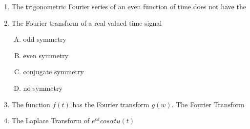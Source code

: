 \documentclass[journal,12pt,twocolumn]{IEEEtran}
\begin{document}
\begin{enumerate}
\setlength\itemsep{2em}
\item The trigonometric Fourier series of an even function of time does not have the\\

\begin{enumerate}[(A)]
\end{enumerate}

\item The Fourier transform of a real valued time signal\\

\begin{enumerate}[(A)]
\setlength\itemsep{2em}

\item odd symmetry
\item even symmetry
\item conjugate symmetry
\item no symmetry

\end{enumerate}

\item The function $f(t)$ has the Fourier transform $g(w)$. The Fourier Transform

\begin{enumerate}[(A)]
\end{enumerate}

\item The Laplace Transform of $e^{\alpha t}{cos{\alpha t} u(t)}$\\
\begin{enumerate}[(A)]
\begin{multicols}{2}
\setlength\itemsep{2em}


\end{multicols}
\end{enumerate}
\end{enumerate}
\end{document}
